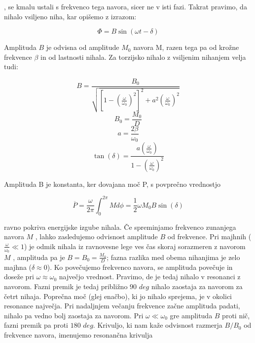 , se kmalu ustali s frekvenco tega navora, sicer ne v isti fazi. Takrat pravimo, da nihalo vsiljeno niha, kar opišemo z izrazom:

\centering \Large
\begin{equation}
    \Phi = B \sin(\omega t - \delta)
\end{equation}
\raggedright \normalsize

Amplituda $B$ je odvisna od amplitude $M_0$ navora M, razen tega pa od krožne frekvence $\beta$ in od lastnosti nihala. Za torzijsko nihalo z vsiljenim nihanjem velja tudi:

\centering \Large
\begin{equation}
    B = \frac{B_0}{\sqrt{[1-(\frac{\omega}{\omega_0})^2]^2 + a^2(\frac{\omega}{\omega_0})^2}}
\end{equation}
\begin{equation}
    B_0 = \frac{M_0}{D}
\end{equation}
\begin{equation}
    a = \frac{2\beta}{\omega_0}
\end{equation}
\begin{equation}
     \tan(\delta) = \frac{a(\frac{\omega}{\omega_0})}{1-(\frac{\omega}{\omega_0})^2}
\end{equation}
\raggedright \normalsize

Amplituda B je konstanta, ker dovajana moč P, s povprečno vrednostjo

\centering \Large
\begin{equation}
    \overline{P} = \frac{\omega}{2\pi} \int_0^{2\pi} Md\phi= \frac{1}{2}\omega M_0 B \sin(\delta)
\end{equation}
\raggedright \normalsize

ravno pokriva energijske izgube nihala.
Če spreminjamo frekvenco zunanjega navora $M$ , lahko zasledujemo odvisnost amplitude $B$ od frekvence. Pri majhnih ($\frac{\omega}{\omega_0} \ll 1$) je odmik nihala iz ravnovesne lege ves čas skoraj sorazmeren z navorom $M$ , amplituda pa je $B = B_0 = \frac{M_0}{D}$; fazna razlika med obema nihanjima je zelo majhna ($\delta \approx 0$). Ko povečujemo frekvenco navora, se amplituda povečuje in doseže pri $\omega \approx \omega_0$ največjo vrednost. Pravimo, de je tedaj nihalo v resonanci z navorom. Fazni premik je tedaj približno $90$ $deg$ nihalo zaostaja za navorom za četrt nihaja. Poprečna moč (glej enačbo), ki jo nihalo sprejema, je v okolici resonance največja. Pri nadaljnjem večanju frekvence začne amplituda padati, nihalo pa vedno bolj zaostaja za
navorom. Pri $\omega \ll \omega_0$ gre amplituda $B$ proti nič, fazni premik pa proti $180$ $deg$.
Krivuljo, ki nam kaže odvisnost razmerja $B/B_0$ od frekvence navora, imenujemo
resonančna krivulja 

